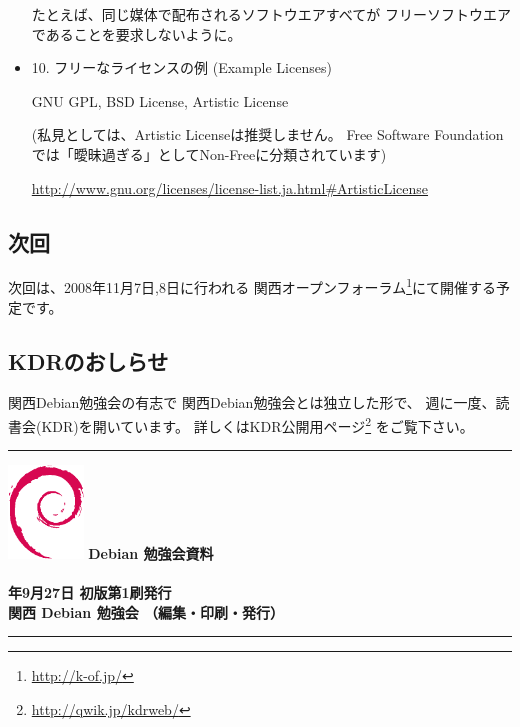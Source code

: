 \documentclass[mingoth,a4paper]{jsarticle}
\newcommand{\debmtgyear}{2008}
\newcommand{\debmtgdate}{27}
\newcommand{\debmtgmonth}{9}
\begin{document}
\begin{itemize}
たとえば、同じ媒体で配布されるソフトウエアすべてが
フリーソフトウエアであることを要求しないように。

 \item 10. フリーなライセンスの例
   (Example Licenses)

GNU GPL, BSD License, Artistic License

(私見としては、Artistic Licenseは推奨しません。
Free Software Foundationでは「曖昧過ぎる」としてNon-Freeに分類されています)

\url{http://www.gnu.org/licenses/license-list.ja.html#ArtisticLicense}

\end{itemize}


\subsection{次回}
次回は、2008年11月7日,8日に行われる
関西オープンフォーラム\footnote{\url{http://k-of.jp/}}にて開催する予定です。

\subsection{KDRのおしらせ}
関西Debian勉強会の有志で
関西Debian勉強会とは独立した形で、
週に一度、読書会(KDR)を開いています。
詳しくはKDR公開用ページ\footnote{\url{http://qwik.jp/kdrweb/}}
をご覧下さい。

\mbox{}\newpage

\printindex
 \cleartooddpage

 \begin{minipage}[b]{0.2\hsize}
 \end{minipage}
 \begin{minipage}[b]{0.8\hsize}

 \vspace*{15cm}
 \rule{\hsize}{1mm}
 \vspace{2mm}
 \includegraphics[width=2cm]{image200502/openlogo-nd.eps}
 \noindent \Large \bf Debian 勉強会資料\\ \\
 \noindent \normalfont \debmtgyear{}年\debmtgmonth{}月\debmtgdate{}日 \hspace{5mm}  初版第1刷発行\\
 \noindent \normalfont 関西 Debian 勉強会 （編集・印刷・発行）\\
 \rule{\hsize}{1mm}
 \end{minipage}
\end{document}
